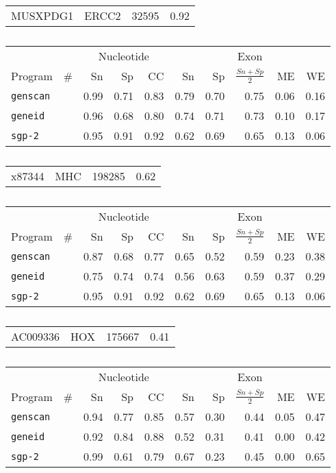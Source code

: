 \begin{table}[!ht]
\caption{}
\label{tbl:mit}

\begin{tabular}{llrr}
MUSXPDG1 &  ERCC2  &  32595 & 0.92
\end{tabular}

\begin{center}
\begin{tabular}{|l|r|rrr|rrr|rr|}
\hline
& & \multicolumn{3}{c|}{Nucleotide} & \multicolumn{5}{c|}{Exon} \\
Program & \# & Sn & Sp & CC & Sn & Sp & $\frac{Sn+Sp}{2}$ & ME & WE \\
\hline
{\tt genscan} &  & 0.99 & 0.71 & 0.83 & 0.79 & 0.70 & 0.75 & 0.06 & 0.16 \\
{\tt geneid} &  & 0.96 & 0.68 & 0.80 & 0.74 & 0.71 & 0.73 & 0.10 & 0.17 \\
{\tt sgp-2} &  & 0.95 & 0.91 & 0.92 & 0.62 & 0.69 & 0.65 & 0.13 & 0.06 \\
\hline
\end{tabular}
\end{center}


\begin{tabular}{llrr}
x87344 & MHC  & 198285 & 0.62
\end{tabular}

\begin{center}
\begin{tabular}{|l|r|rrr|rrr|rr|}
\hline
& & \multicolumn{3}{c|}{Nucleotide} & \multicolumn{5}{c|}{Exon} \\
Program & \# & Sn & Sp & CC & Sn & Sp & $\frac{Sn+Sp}{2}$ & ME & WE \\
\hline
{\tt genscan} &  & 0.87 & 0.68 & 0.77 & 0.65 & 0.52 & 0.59 & 0.23 & 0.38 \\
{\tt geneid} &  & 0.75 & 0.74 & 0.74 & 0.56 & 0.63 & 0.59 & 0.37 & 0.29 \\
{\tt sgp-2} &  & 0.95 & 0.91 & 0.92 & 0.62 & 0.69 & 0.65 & 0.13 & 0.06 \\
\hline
\end{tabular}
\end{center}


\begin{tabular}{llrr}
AC009336 &  HOX & 175667 & 0.41 
\end{tabular}
\begin{center}
\begin{tabular}{|l|r|rrr|rrr|rr|}
\hline
& & \multicolumn{3}{c|}{Nucleotide} & \multicolumn{5}{c|}{Exon} \\
Program & \# & Sn & Sp & CC & Sn & Sp & $\frac{Sn+Sp}{2}$ & ME & WE \\
\hline
{\tt genscan} &  & 0.94 & 0.77 & 0.85 & 0.57 & 0.30 & 0.44 & 0.05 & 0.47 \\
{\tt geneid} &  & 0.92 & 0.84 & 0.88 & 0.52 & 0.31 & 0.41 & 0.00 & 0.42 \\
{\tt sgp-2} &  & 0.99 & 0.61 & 0.79 & 0.67 & 0.23 & 0.45 & 0.00 & 0.65 \\
\hline
\end{tabular}
\end{center}




\end{table}

